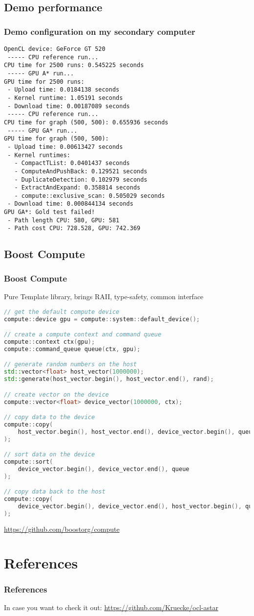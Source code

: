\documentclass{beamer}
\begin{document}
\subsection{Demo performance}
\begin{frame}[fragile]
    \frametitle{Demo configuration on my secondary computer}
    \scriptsize
    \begin{verbatim}
OpenCL device: GeForce GT 520
 ----- CPU reference run...
CPU time for 2500 runs: 0.545225 seconds
 ----- GPU A* run...
GPU time for 2500 runs:
 - Upload time: 0.0184138 seconds
 - Kernel runtime: 1.05191 seconds
 - Download time: 0.00187089 seconds
 ----- CPU reference run...
CPU time for graph (500, 500): 0.655936 seconds
 ----- GPU GA* run...
GPU time for graph (500, 500):
 - Upload time: 0.00613427 seconds
 - Kernel runtimes: 
   - CompactTList: 0.0401437 seconds
   - ComputeAndPushBack: 0.129521 seconds
   - DuplicateDetection: 0.102979 seconds
   - ExtractAndExpand: 0.358814 seconds
   - compute::exclusive_scan: 0.505029 seconds
 - Download time: 0.000844134 seconds
GPU GA*: Gold test failed!
 - Path length CPU: 580, GPU: 581
 - Path cost CPU: 728.528, GPU: 742.369
    \end{verbatim}
\end{frame}

\subsection{Boost Compute}
\begin{frame}[fragile]
    \frametitle{Boost Compute}
Pure Template library, brings RAII, type-safety, common interface
    \begin{lstlisting}[language=C++,basicstyle=\tiny]
// get the default compute device
compute::device gpu = compute::system::default_device();

// create a compute context and command queue
compute::context ctx(gpu);
compute::command_queue queue(ctx, gpu);

// generate random numbers on the host
std::vector<float> host_vector(1000000);
std::generate(host_vector.begin(), host_vector.end(), rand);

// create vector on the device
compute::vector<float> device_vector(1000000, ctx);

// copy data to the device
compute::copy(
    host_vector.begin(), host_vector.end(), device_vector.begin(), queue
);

// sort data on the device
compute::sort(
    device_vector.begin(), device_vector.end(), queue
);

// copy data back to the host
compute::copy(
    device_vector.begin(), device_vector.end(), host_vector.begin(), queue
);
    \end{lstlisting}
    \url{https://github.com/boostorg/compute}
\end{frame}

\section*{References}
\begin{frame}
    \frametitle{References}
    
    \vspace{2em}
    In case you want to check it out: \url{https://github.com/Kruecke/ocl-astar}
\end{frame}
\end{document}
